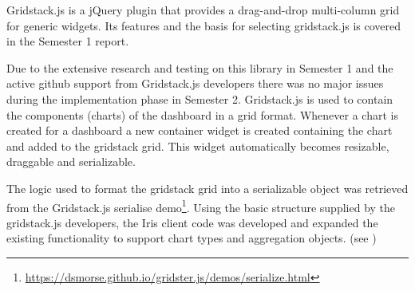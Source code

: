 \documentclass[12pt,a4paper,titlepage]{report}
\begin{document}
Gridstack.js is a jQuery plugin that provides a drag-and-drop multi-column grid for generic widgets. 
Its features and the basis for selecting gridstack.js is covered in the Semester 1 report.  
 
Due to the extensive research and testing on this library in Semester 1 and the active github support from Gridstack.js developers there was no major issues during the implementation phase in Semester 2. Gridstack.js is used to contain the components (charts) of the dashboard in a grid format. Whenever a chart is created for a dashboard a new container widget is created containing the chart and added to the gridstack grid. This widget automatically becomes resizable, draggable and serializable.

The logic used to format the gridstack grid into a serializable object was retrieved from the Gridstack.js serialise demo\footnote{\url{https://dsmorse.github.io/gridster.js/demos/serialize.html}}. Using the basic structure supplied by the gridstack.js developers, the Iris client code was developed and expanded the existing functionality to support chart types and aggregation objects. (see )
\end{document}
